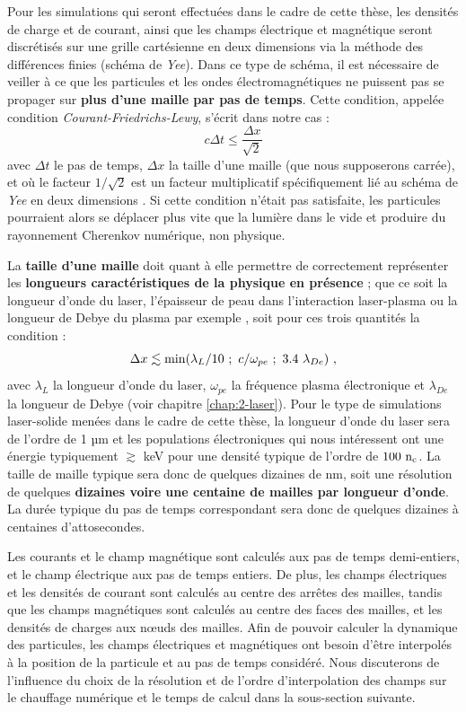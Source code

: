 \begin{refsection}
Pour les simulations qui seront effectuées dans le cadre de cette thèse, les densités de charge et de courant, ainsi que les champs électrique et magnétique seront discrétisés sur une grille cartésienne en deux dimensions via la méthode des différences finies (schéma de \textit{Yee}).
Dans ce type de schéma, il est nécessaire de veiller à ce que les particules et les ondes électromagnétiques ne puissent pas se propager sur \textbf{plus d'une maille par pas de temps}. Cette condition, appelée condition \textit{Courant-Friedrichs-Lewy}, s'écrit dans notre cas \parencite{nuter_2014} :
\begin{equation}
    c \Delta t \leq \dfrac{\Delta x}{\sqrt{2}}
    \label{eq:4-PIC_CFL}
\end{equation}
avec $\Delta t$ le pas de temps, $\Delta x$ la taille d'une maille (que nous supposerons carrée), et où le facteur $1/\sqrt{2}$ est un facteur multiplicatif spécifiquement lié au schéma de \textit{Yee} en deux dimensions \parencite{nuter_2014}. Si cette condition n'était pas satisfaite, les particules pourraient alors se déplacer plus vite que la lumière dans le vide et produire du rayonnement Cherenkov numérique, non physique.

La \textbf{taille d'une maille} doit quant à elle permettre de correctement représenter les \textbf{longueurs caractéristiques de la physique en présence} ; que ce soit la longueur d'onde du laser, l'épaisseur de peau dans l'interaction laser-plasma ou la longueur de Debye du plasma par exemple \parencite{tskhakaya_2007}, soit pour ces trois quantités la condition : 
\begin{equation}
    \Delta x \lesssim \min(\lambda_L/10 ~ ; ~ c/\omega_{pe} ~ ; ~ 3.4 ~ \lambda_{De}) ~ \rm ,
\end{equation}
avec $\lambda_L$ la longueur d'onde du laser, $\omega_{pe}$ la fréquence plasma électronique et $\lambda_{De}$ la longueur de Debye (voir chapitre \ref{chap:2-laser}). Pour le type de simulations laser-solide menées dans le cadre de cette thèse, la longueur d'onde du laser sera de l'ordre de 1 µm et les populations électroniques qui nous intéressent ont une énergie typiquement $\gtrsim$ keV pour une densité typique de l'ordre de $100 ~ \rm n_c$. La taille de maille typique sera donc de quelques dizaines de nm, soit une résolution de quelques \textbf{dizaines voire une centaine de mailles par longueur d'onde}. La durée typique du pas de temps correspondant sera donc de quelques dizaines à centaines d'attosecondes.

Les courants et le champ magnétique sont calculés aux pas de temps demi-entiers, et le champ électrique aux pas de temps entiers. De plus, les champs électriques et les densités de courant sont calculés au centre des arrêtes des mailles, tandis que les champs magnétiques sont calculés au centre des faces des mailles, et les densités de charges aux nœuds des mailles.
Afin de pouvoir calculer la dynamique des particules, les champs électriques et magnétiques ont besoin d'être interpolés à la position de la particule et au pas de temps considéré. Nous discuterons de l'influence du choix de la résolution et de l'ordre d'interpolation des champs sur le chauffage numérique et le temps de calcul dans la sous-section suivante. 


\end{refsection}

